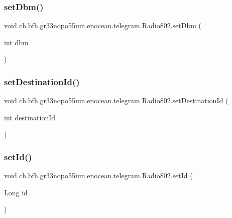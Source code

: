 \subsubsection{\texorpdfstring{set\+Dbm()}{setDbm()}}
{\footnotesize\ttfamily void ch.\+bfh.\+gr33nopo55um.\+enocean.\+telegram.\+Radio802.\+set\+Dbm (\begin{DoxyParamCaption}\item[{int}]{dbm }\end{DoxyParamCaption})}

\hypertarget{classch_1_1bfh_1_1gr33nopo55um_1_1enocean_1_1telegram_1_1_radio802_a822d35f33f68291c0335f34b75c7f45b}{}\label{classch_1_1bfh_1_1gr33nopo55um_1_1enocean_1_1telegram_1_1_radio802_a822d35f33f68291c0335f34b75c7f45b} 
\subsubsection{\texorpdfstring{set\+Destination\+Id()}{setDestinationId()}}
{\footnotesize\ttfamily void ch.\+bfh.\+gr33nopo55um.\+enocean.\+telegram.\+Radio802.\+set\+Destination\+Id (\begin{DoxyParamCaption}\item[{int}]{destination\+Id }\end{DoxyParamCaption})}

\hypertarget{classch_1_1bfh_1_1gr33nopo55um_1_1enocean_1_1telegram_1_1_radio802_a03783741059d9572ad0604182df23d1d}{}\label{classch_1_1bfh_1_1gr33nopo55um_1_1enocean_1_1telegram_1_1_radio802_a03783741059d9572ad0604182df23d1d} 
\subsubsection{\texorpdfstring{set\+Id()}{setId()}}
{\footnotesize\ttfamily void ch.\+bfh.\+gr33nopo55um.\+enocean.\+telegram.\+Radio802.\+set\+Id (\begin{DoxyParamCaption}\item[{Long}]{id }\end{DoxyParamCaption})}

